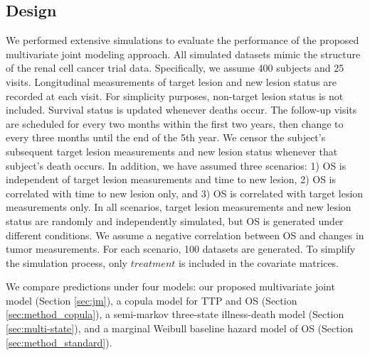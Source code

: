 \subsection{Design}
We performed extensive simulations to evaluate the performance of the proposed multivariate joint modeling approach. All simulated datasets mimic the structure of the renal cell cancer trial data. Specifically, we assume 400 subjects and 25 visits. Longitudinal measurements of target lesion and new lesion status are recorded at each visit. For simplicity purposes, non-target lesion status is not included. Survival status is updated whenever deaths occur. The follow-up visits are scheduled for every two months within the first two years, then change to every three months until the end of the 5th year. We censor the subject's subsequent target lesion measurements and new lesion status whenever that subject's death occurs. In addition, we have assumed three scenarios: 1) \ac{OS} is independent of target lesion measurements and time to new lesion, 2) \ac{OS} is correlated with time to new lesion only, and 3) \ac{OS} is correlated with target lesion measurements only. In all scenarios, target lesion measurements and new lesion status are randomly and independently simulated, but \ac{OS} is generated under different conditions. We assume a negative correlation between \ac{OS} and changes in tumor measurements. For each scenario, 100 datasets are generated. To simplify the simulation process, only $treatment$ is included in the covariate matrices. 

We compare predictions under four models: our proposed multivariate joint model (Section \ref{sec:jm}), a copula model for \ac{TTP} and OS (Section \ref{sec:method_copula}), a semi-markov three-state illness-death model \citep{weber2020statistical} (Section \ref{sec:multi-state}), and a marginal Weibull baseline hazard model of OS (Section \ref{sec:method_standard}). 

